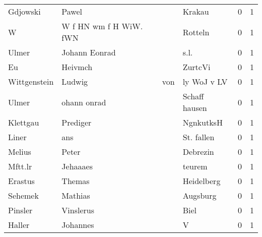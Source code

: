 \begin{center}
\begin{tiny}
\begin{longtabu}{llllrr}
                 Gdjowski &                              Pawel &             &                                      Krakau &          0 &         1 \\
                        W &             W f HN wm f H WiW. fWN &             &                                     Rotteln &          0 &         1 \\
                    Ulmer &                      Johann Eonrad &             &                                        s.l. &          0 &         1 \\
                       Eu &                            Heivmch &             &                                     ZurtcVi &          0 &         1 \\
             Wittgenstein &                             Ludwig &         von &                                 ly WoJ v LV &          0 &         1 \\
                    Ulmer &                        ohann onrad &             &                               Schaff hausen &          0 &         1 \\
                 Klettgau &                           Prediger &             &                                   NgnkutksH &          0 &         1 \\
                    Liner &                                ans &             &                                  St. fallen &          0 &         1 \\
                   Melius &                              Peter &             &                                    Debrezin &          0 &         1 \\
                  Mftt.lr &                           Jehaaaes &             &                                      teurem &          0 &         1 \\
                  Erastus &                             Themas &             &                                  Heidelberg &          0 &         1 \\
                  Sehemek &                            Mathias &             &                                    Augsburg &          0 &         1 \\
                  Pinsler &                          Vinslerus &             &                                        Biel &          0 &         1 \\
                   Haller &                           Johannes &             &                                           V &          0 &         1 \\

\end{longtabu}
\end{tiny}
\end{center}
